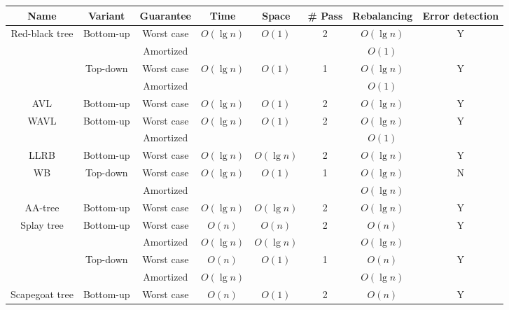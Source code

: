 \begin{table}[!t]
\begin{threeparttable}
\begin{tabular}{cccccccc}
 Name & Variant & Guarantee & Time & Space & \# Pass & Rebalancing & Error detection  \\
 \hline
 \multirow{4}{*}{Red-black tree} & \multirow{2}{*}{Bottom-up} & Worst case & \multirow{2}{*}{$O(\lg n)$} & \multirow{2}{*}{$O(1)$} & \multirow{2}{*}{2} & $O(\lg n)$\tnote{1} & \multirow{2}{*}{Y} \\
  & & Amortized & &  &  & $O(1)$ &  \\
  \cline{2-8}
  & \multirow{2}{*}{Top-down} & Worst case & \multirow{2}{*}{$O(\lg n)$} & \multirow{2}{*}{$O(1)$} & \multirow{2}{*}{1} & $O(\lg n)$ & \multirow{2}{*}{Y} \\
  & & Amortized & & &  & $O(1)$\tnote{2} & \\
  \hline
  AVL & Bottom-up & Worst case & $O(\lg n)$ & $O(1)$ & 2 & $O(\lg n)$\tnote{3} & Y \\
  \hline
  \multirow{2}{*}{WAVL} & \multirow{2}{*}{Bottom-up} & Worst case & \multirow{2}{*}{$O(\lg n)$} & \multirow{2}{*}{$O(1)$} & \multirow{2}{*}{2} & $O(\lg n)$\tnote{4} & \multirow{2}{*}{Y} \\
  & & Amortized & & & & $O(1)$ & \\
  \hline
  LLRB & Bottom-up & Worst case & $O(\lg n)$ & $O(\lg n)$ & 2 & $O(\lg n)$ & Y \\
  \hline
  \multirow{2}{*}{WB} & \multirow{2}{*}{Top-down} & Worst case & \multirow{2}{*}{$O(\lg n)$} & \multirow{2}{*}{$O(1)$} & \multirow{2}{*}{1} & $O(\lg n)$ & \multirow{2}{*}{N\tnote{5}} \\
  & & Amortized &  & & & $O(\lg n)$\tnote{6} &  \\
  \hline
  AA-tree & Bottom-up & Worst case & $O(\lg n)$ & $O(\lg n)$ & 2 & $O(\lg n)$ & Y \\
  \hline
  \multirow{4}{*}{Splay tree} & \multirow{2}{*}{Bottom-up} & Worst case & $O(n)$ & $O(n)$ & \multirow{2}{*}{2} & $O(n)$ & \multirow{2}{*}{Y} \\
  & & Amortized & $O(\lg n)$ & $O(\lg n)$ & & $O(\lg n)$ & \\
   & \multirow{2}{*}{Top-down} & Worst case & $O(n)$ & \multirow{2}{*}{$O(1)$} & \multirow{2}{*}{1} & $O(n)$ & \multirow{2}{*}{Y} \\
  & & Amortized & $O(\lg n)$ &  & & $O(\lg n)$ & \\
  \hline
  \multirow{2}{*}{Scapegoat tree} & \multirow{2}{*}{Bottom-up} & Worst case & $O(n)$ & \multirow{2}{*}{$O(1)$\tnote{7}} & \multirow{2}{*}{2} & $O(n)$ & \multirow{2}{*}{Y} \\

\end{tabular}
\end{threeparttable}
\end{table}
